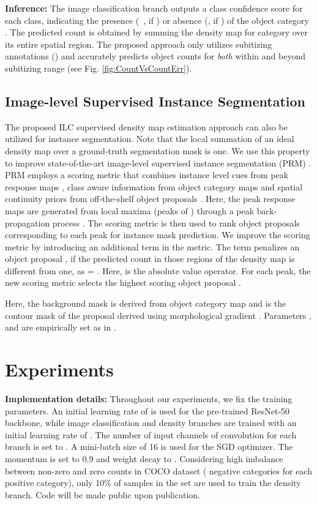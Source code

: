 \documentclass[10pt,twocolumn,letterpaper]{article}
\begin{document}
\noindent\textbf{Inference:} 
The image classification branch outputs a class confidence score  for each class, indicating the  presence (~, if ) or absence (, if   ) of  the object category .  
The predicted count  is obtained by summing the density map  for  category  over its entire spatial region. The proposed approach only utilizes subitizing annotations () and accurately predicts object counts for \emph{both} within and beyond subitizing range  (see Fig. \ref{fig:CountVsCountErr}).  \subsection{Image-level Supervised Instance Segmentation}
 \label{sec:instanceSeg}
The proposed ILC supervised density map estimation approach can also be utilized for instance segmentation. Note that the local summation of an ideal density map over a ground-truth segmentation mask is one. 
 We use this property to improve state-of-the-art image-level supervised instance segmentation (PRM) \cite{PRM}. PRM employs a scoring metric that combines instance level cues from peak response maps , class aware information from object category maps and spatial continuity priors from off-the-shelf object proposals \cite{mcg_2017,cob_eccv2016}. Here, the peak response maps are generated from local maxima (peaks of ) through a peak back-propagation process \cite{PRM}. The scoring metric is then used to rank object proposals corresponding to each peak for instance mask prediction. We improve the scoring metric by introducing an additional term  in the  metric.  The term   penalizes an object proposal , if the predicted count in those regions of the density map  is different from one, as = . Here,  is the absolute value operator. 
For each peak, the new scoring metric   selects the  highest scoring object proposal . 
  \vspace{-0.1cm}

Here, the background mask  is derived from object category map and  is the contour mask of the proposal  derived using morphological gradient \cite{PRM}. Parameters ,    and  are empirically set as in \cite{PRM}. 

 




\vspace{-0.1cm}
\section{Experiments}
\vspace{-0.1cm}
\noindent\textbf{Implementation details:}
Throughout our experiments, we fix the training parameters. An initial learning rate of  is used for the pre-trained ResNet-50 backbone, while image classification and density branches are trained with an initial learning rate of  . The number of input channels  of  convolution for each branch is set to . A mini-batch size of 16 is used for the SGD optimizer. 
The momentum  is set to 0.9 and weight decay to . Considering high imbalance between  non-zero and zero counts in COCO dataset ( negative categories for each positive category), only 10\% of  samples in the set  are used to train the density branch. 
Code will be made public upon publication. 
\end{document}
